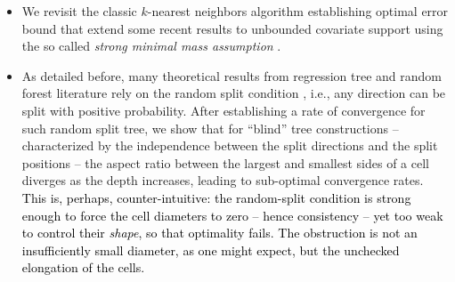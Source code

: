 \documentclass[paper=a4, fontsize=11pt]{scrartcl}
\newcommand{\rev}[1]{\textcolor{black}{#1}}
\begin{document}
\begin{itemize}
\item[(i)] 
We revisit the classic $k$-nearest neighbors algorithm establishing optimal error bound that extend some recent results \cite{jiang2019non,portier2021nearest} to unbounded covariate support using the so called \textit{strong minimal mass assumption}  \cite{gadat2016classification}.  
    \item[(ii)]  As detailed before, many theoretical results from regression tree and random forest literature rely on  the random split condition \cite{biau2012analysis,duroux2018impact,wager2018estimation}, i.e., any direction can be split with positive probability.
After establishing a rate of convergence for such random split tree,  %
we show that for ``blind'' tree constructions -- characterized by the independence between the split directions and the split positions -- the aspect ratio between the largest and smallest sides of a cell diverges as the depth increases, leading to sub-optimal convergence rates.
\rev{This is, perhaps, counter-intuitive: the random-split condition is strong enough to force the cell diameters to zero -- hence consistency -- yet too weak to control their \emph{shape}, so that optimality fails. The obstruction is not an insufficiently small diameter, as one might expect, but the unchecked elongation of the cells.}



\end{itemize}
\end{document}

